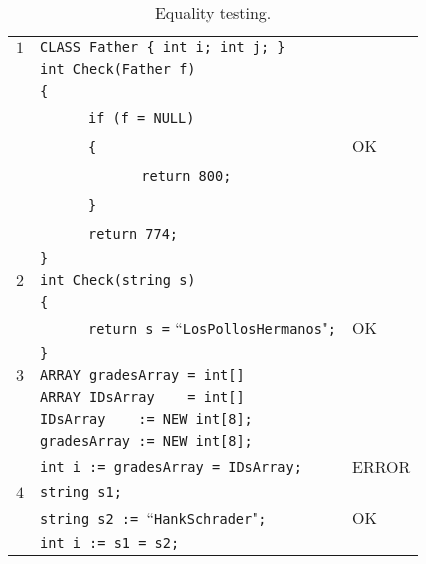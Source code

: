\documentclass{article}
\begin{document}
\begin{table}[h]
\centering
\begin{tabular}{|l|l|l|}
\hline
 $1$ & \verb"CLASS Father { int i; int j; }" &    \\
     & \verb"int Check(Father f)"            &    \\
     & \verb"{"                              &    \\
     & ~ ~ ~ ~\verb"if (f = NULL)"           &    \\
     & ~ ~ ~ ~\verb"{"                       & OK \\
     & ~ ~ ~ ~ ~ ~ ~ ~\verb"return 800;"     &    \\
     & ~ ~ ~ ~\verb"}"                       &    \\
     & ~ ~ ~ ~\verb"return 774;"             &    \\
     & \verb"}"                              &    \\
\hline
 $2$ & \verb"int Check(string s)"                                   &    \\
     & \verb"{"                                                     &    \\
     & ~ ~ ~ ~\verb"return s =" ``\verb"LosPollosHermanos""\verb";" & OK \\
     & \verb"}"                                                     &    \\
\hline
 $3$ & \verb"ARRAY gradesArray = int[]"        &       \\
     & \verb"ARRAY IDsArray    = int[]"        &       \\
     & \verb"IDsArray    := NEW int[8];"       &       \\
     & \verb"gradesArray := NEW int[8];"       &       \\
     & \verb"int i := gradesArray = IDsArray;" & ERROR \\
\hline
 $4$ & \verb"string s1;"                                  &    \\
     & \verb"string s2 := "``\verb"HankSchrader""\verb";" & OK \\
     & \verb"int i := s1 = s2;"                           &    \\
\hline
\end{tabular}
\caption{Equality testing.
\label{Table_Code_Examples_Equality_Testing}}
\end{table}
\newpage
\end{document}
